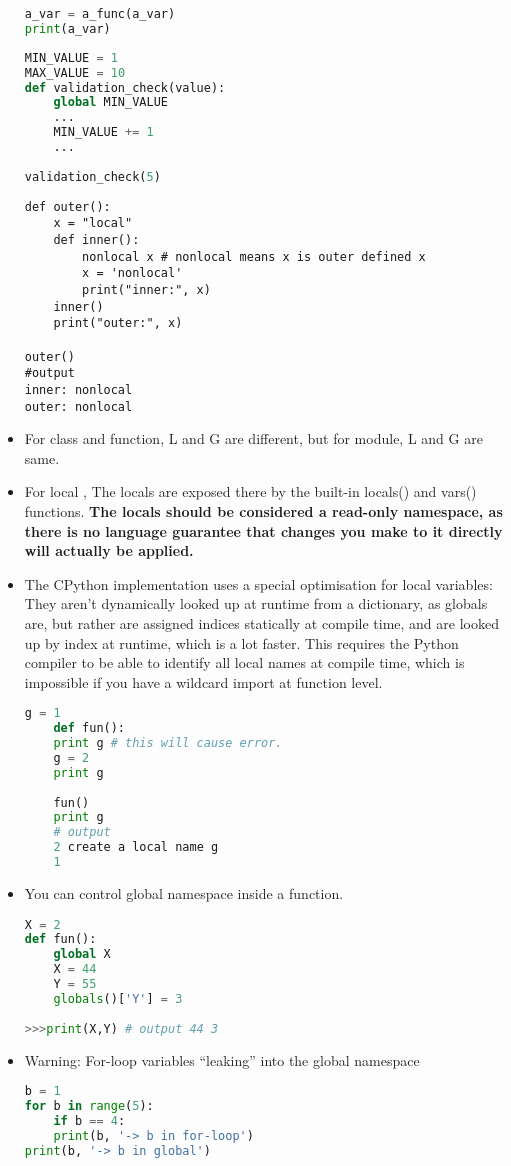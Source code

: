 \documentclass[a4paper,12pt,twoside]{book}
\begin{document}
\begin{itemize}
\begin{lstlisting}[frame=single, language=Python]
a_var = a_func(a_var)
print(a_var)
\end{lstlisting} 

\begin{lstlisting}[frame=single, language=Python]
MIN_VALUE = 1
MAX_VALUE = 10
def validation_check(value):
	global MIN_VALUE
	...
	MIN_VALUE += 1
	...
	
validation_check(5)
\end{lstlisting} 

\begin{lstlisting}
def outer():
	x = "local"
	def inner():
		nonlocal x # nonlocal means x is outer defined x
		x = 'nonlocal'
		print("inner:", x)
	inner()
	print("outer:", x)
	
outer()
#output
inner: nonlocal
outer: nonlocal
\end{lstlisting}
	
	\item For class and function, L and G are different, but for module, L and G are same.
	\item For local , The locals are exposed there by the built-in locals() and vars() functions. \textbf{The locals should be considered a read-only namespace, as there is no language guarantee that changes you make to it directly will actually be applied.}
		\item The CPython implementation uses a special optimisation for local variables: They aren't dynamically looked up at runtime from a dictionary, as globals are, but rather are assigned indices statically at compile time, and are looked up by index at runtime, which is a lot faster. This requires the Python compiler to be able to identify all local names at compile time, which is impossible if you have a wildcard import at function level.
	\begin{lstlisting}[frame=single, language=Python]
	g = 1
	def fun():
	print g # this will cause error. 
	g = 2
	print g
	
	fun()
	print g
	# output 
	2 create a local name g
	1
	\end{lstlisting}  
	\item You can control global namespace inside a function.
\begin{lstlisting}[frame=single, language=Python]
X = 2
def fun():
	global X
	X = 44
	Y = 55
	globals()['Y'] = 3
	
>>>print(X,Y) # output 44 3
\end{lstlisting}  

\item Warning: For-loop variables “leaking” into the global namespace
\begin{lstlisting}[frame=single, language=Python]
b = 1
for b in range(5):
	if b == 4:
	print(b, '-> b in for-loop')
print(b, '-> b in global')


\end{lstlisting}
\end{itemize}
\end{document}

